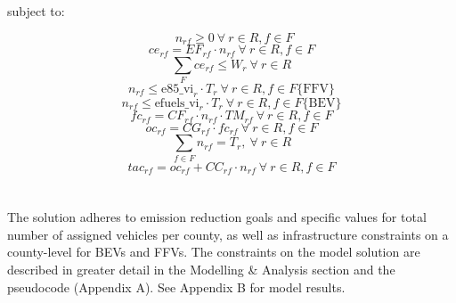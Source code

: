 \documentclass[answers]{exam}
\begin{document}
\begin{outline}
\2 subject to:
\end{outline}
$$ \ \ n_{rf} \geq 0  \  \forall \  r \in R, f \in F$$
$$ce_{rf} = EF_{rf}\cdot n_{rf}  \  \forall \ r \in R, f \in F$$
$$\sum_F ce_{rf}\leq W_r  \  \forall \  r \in R$$
$$n_{rf} \leq \text{e85\_vi}_{r}\cdot T_r \ \forall \ r \in R, f \in F\{\text{FFV}\}$$
$$n_{rf} \leq \text{efuels\_vi}_{r}\cdot T_r \ \forall \ r \in R, f \in F\{\text{BEV}\}$$
$$fc_{rf} = CF_{rf}\cdot n_{rf}\cdot TM_{rf}\ \forall \ r \in R, f \in F$$
$$oc_{rf} = CG_{rf}\cdot fc_{rf} \ \forall \ r \in R, f \in F$$
$$\sum_{f\in F} n_{rf} = T_{r}, \ \forall \ r \in R$$
$$tac_{rf} = oc_{rf} + CC_{rf}\cdot n_{rf} \ \forall \ r \in R, f \in F$$
\\~\\
The solution adheres to emission reduction goals and specific values for total number of assigned vehicles per county, as well as infrastructure constraints on a county-level for BEVs and FFVs. The constraints on the model solution are described in greater detail in the Modelling \& Analysis section and the pseudocode (Appendix A). See Appendix B for model results. 
\newpage
\end{document}

